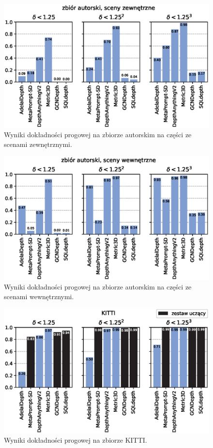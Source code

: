 \begin{figure}[H]
    \centering
    \includegraphics{plots/delta/3}
    \caption{Wyniki dokładności progowej na zbiorze autorskim na części ze scenami zewnętrznymi.}
    \label{fig:delta_3}
\end{figure}
\begin{figure}[H]
    \centering
    \includegraphics{plots/delta/4}
    \caption{Wyniki dokładności progowej na zbiorze autorskim na części ze scenami wewnętrznymi.}
    \label{fig:delta_4}
\end{figure}
\begin{figure}[H]
    \centering
    \includegraphics{plots/delta/5}
    \caption{Wyniki dokładności progowej na zbiorze KITTI.}
    \label{fig:delta_5}
\end{figure}

